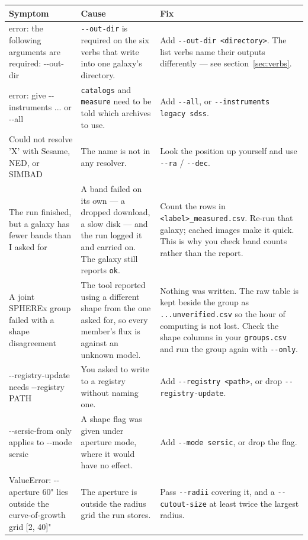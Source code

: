 \documentclass[11pt]{article}
\begin{document}
\begin{longtable}{T{3.5cm} L{4.2cm} L{6.9cm}}
\toprule
\textbf{\normalfont Symptom} & \textbf{Cause} & \textbf{Fix} \\
\midrule
\endhead
error: the following arguments are required: -{}-out-dir &
  \texttt{-{}-out-dir} is required on the six verbs that write into one
  galaxy's directory. & Add \texttt{-{}-out-dir <directory>}. The list
  verbs name their outputs differently --- see section~\ref{sec:verbs}.
  \\[2pt]
error: give -{}-instruments ... or -{}-all & \texttt{catalogs} and
  \texttt{measure} need to be told which archives to use. & Add
  \texttt{-{}-all}, or \texttt{-{}-instruments legacy sdss}. \\[2pt]
Could not resolve 'X' with Sesame, NED, or SIMBAD & The name is not in any
  resolver. & Look the position up yourself and use \texttt{-{}-ra} /
  \texttt{-{}-dec}. \\[2pt]
The run finished, but a galaxy has fewer bands than I asked for &
  A band failed on its own --- a dropped download, a slow disk --- and the
  run logged it and carried on. The galaxy still reports \texttt{ok}. &
  Count the rows in \texttt{<label>\_measured.csv}. Re-run that galaxy;
  cached images make it quick. This is why you check band counts rather
  than the report. \\[2pt]
A joint SPHEREx group failed with a shape disagreement &
  The tool reported using a different shape from the one asked for, so
  every member's flux is against an unknown model. & Nothing was written.
  The raw table is kept beside the group as
  \texttt{...unverified.csv} so the hour of computing is not lost. Check
  the shape columns in your \texttt{groups.csv} and run the group again
  with \texttt{-{}-only}. \\[2pt]
-{}-registry-update needs -{}-registry PATH & You asked to write to a
  registry without naming one. & Add \texttt{-{}-registry <path>}, or drop
  \texttt{-{}-registry-update}. \\[2pt]
-{}-sersic-from only applies to -{}-mode sersic & A shape flag was given
  under aperture mode, where it would have no effect. & Add
  \texttt{-{}-mode sersic}, or drop the flag. \\[2pt]
ValueError: -{}-aperture 60" lies outside the curve-of-growth grid
  [2, 40]" & The aperture is outside the radius grid the run stores. &
  Pass \texttt{-{}-radii} covering it, and a \texttt{-{}-cutout-size} at
  least twice the largest radius. \\[2pt]

\end{longtable}
\end{document}
